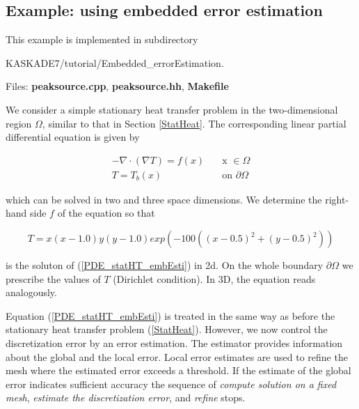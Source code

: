 \documentclass[11pt]{article}
\begin{document}
\subsection{Example: using embedded error estimation}\label{EmbeddEsti}

This example is implemented in subdirectory 
\begin{center} KASKADE7/tutorial/Embedded\_errorEstimation.\end{center}

\noindent Files: {\bf peaksource.cpp}, {\bf peaksource.hh}, {\bf Makefile}

\noindent We consider a simple stationary heat transfer problem in the two-dimensional 
region $\Omega$, similar to that in Section \ref{StatHeat}. The corresponding linear partial differential equation is given by


\begin{equation}\label{PDE_statHT_embEsti}
\begin{array}{rcl}
 -\nabla  \cdot (\nabla T) = f(x) \quad &\mbox{x }\in  \Omega\\[2mm]
T = T_b(x) \quad & \mbox{on } \partial \Omega
\end{array}
\end{equation}

\noindent which can be solved in two and three space dimensions.
We determine the right-hand side $f$ of the equation so that 

\[
 T  = x(x-1.0)y(y-1.0) exp(-100 ( (x-0.5)^2 + (y-0.5)^2)) 
\]

\noindent is the soluton of (\ref{PDE_statHT_embEsti}) in 2d. 
On the whole boundary $\partial \Omega$ we prescribe the values of $T$ (Dirichlet condition).
In 3D, the equation reads analogously.


Equation (\ref{PDE_statHT_embEsti}) is treated in the same way as before the stationary heat transfer problem 
(\ref{StatHeat}). However, we now control the discretization error by an error estimation.
The estimator provides information about the global and the local error. Local error
estimates are used to refine the mesh where the estimated error exceeds a threshold.
If the estimate of the global error indicates sufficient accuracy the sequence of
{\em compute solution on a fixed mesh}, {\em estimate the discretization error}, and
{\em refine} stops.
\end{document}
